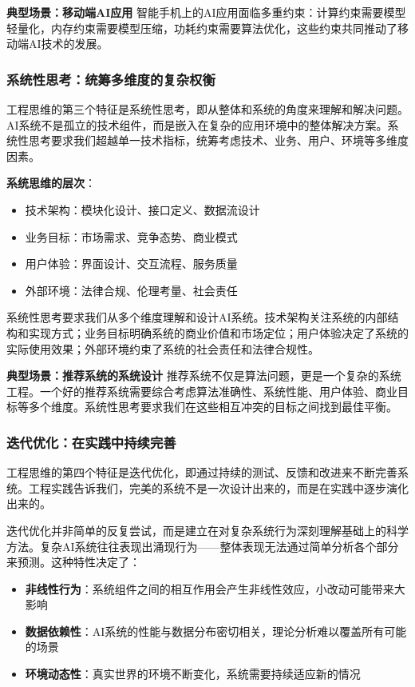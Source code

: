 \textbf{典型场景：移动端AI应用}
智能手机上的AI应用面临多重约束：计算约束需要模型轻量化，内存约束需要模型压缩，功耗约束需要算法优化，这些约束共同推动了移动端AI技术的发展。

\subsubsection{系统性思考：统筹多维度的复杂权衡}

工程思维的第三个特征是系统性思考，即从整体和系统的角度来理解和解决问题。AI系统不是孤立的技术组件，而是嵌入在复杂的应用环境中的整体解决方案。系统性思考要求我们超越单一技术指标，统筹考虑技术、业务、用户、环境等多维度因素。

\textbf{系统思维的层次}：
\begin{itemize}
\item 技术架构：模块化设计、接口定义、数据流设计
\item 业务目标：市场需求、竞争态势、商业模式
\item 用户体验：界面设计、交互流程、服务质量
\item 外部环境：法律合规、伦理考量、社会责任
\end{itemize}

系统性思考要求我们从多个维度理解和设计AI系统。技术架构关注系统的内部结构和实现方式；业务目标明确系统的商业价值和市场定位；用户体验决定了系统的实际使用效果；外部环境约束了系统的社会责任和法律合规性。

\textbf{典型场景：推荐系统的系统设计}
推荐系统不仅是算法问题，更是一个复杂的系统工程。一个好的推荐系统需要综合考虑算法准确性、系统性能、用户体验、商业目标等多个维度。系统性思考要求我们在这些相互冲突的目标之间找到最佳平衡。

\subsubsection{迭代优化：在实践中持续完善}

工程思维的第四个特征是迭代优化，即通过持续的测试、反馈和改进来不断完善系统。工程实践告诉我们，完美的系统不是一次设计出来的，而是在实践中逐步演化出来的。

迭代优化并非简单的反复尝试，而是建立在对复杂系统行为深刻理解基础上的科学方法。复杂AI系统往往表现出涌现行为——整体表现无法通过简单分析各个部分来预测。这种特性决定了：

\begin{itemize}
\item \textbf{非线性行为}：系统组件之间的相互作用会产生非线性效应，小改动可能带来大影响
\item \textbf{数据依赖性}：AI系统的性能与数据分布密切相关，理论分析难以覆盖所有可能的场景
\item \textbf{环境动态性}：真实世界的环境不断变化，系统需要持续适应新的情况
\end{itemize}

